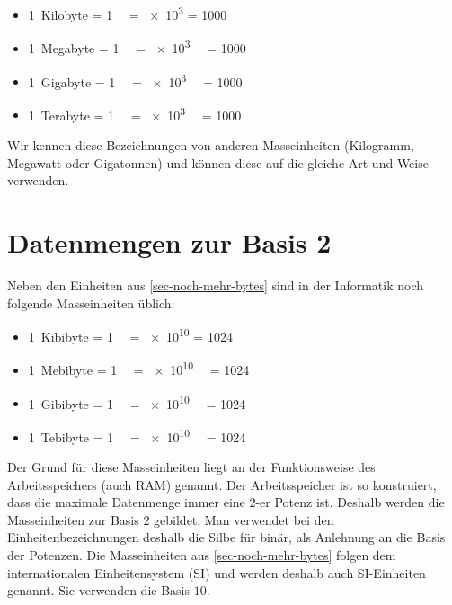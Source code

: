 \begin{itemize}
\item \qty{1}{Kilobyte} = \qty{1}{\kilo\byte} = \qty{e3}{\byte} = \qty{1000}{\byte}
\item \qty{1}{Megabyte} = \qty{1}{\mega\byte} = \qty{e3}{\kilo\byte} = \qty{1000}{\kilo\byte}
\item \qty{1}{Gigabyte} = \qty{1}{\giga\byte} = \qty{e3}{\mega\byte} = \qty{1000}{\mega\byte}
\item \qty{1}{Terabyte} = \qty{1}{\tera\byte} = \qty{e3}{\giga\byte} = \qty{1000}{\giga\byte}
\end{itemize}

Wir kennen diese Bezeichnungen von anderen Masseinheiten (Kilogramm, Megawatt oder Gigatonnen) und können diese auf die gleiche Art und Weise verwenden.

\section{Datenmengen zur Basis 2}

Neben den Einheiten aus \autoref{sec-noch-mehr-bytes} sind in der Informatik noch folgende Masseinheiten üblich:

\begin{itemize}
\item \qty{1}{Kibibyte} = \qty{1}{\kibi\byte} = \qty{e10}{\byte} = \qty{1024}{\byte}
\item \qty{1}{Mebibyte} = \qty{1}{\mebi\byte} = \qty{e10}{\kibi\byte} = \qty{1024}{\kibi\byte}
\item \qty{1}{Gibibyte} = \qty{1}{\gibi\byte} = \qty{e10}{\mebi\byte} = \qty{1024}{\mebi\byte}
\item \qty{1}{Tebibyte} = \qty{1}{\tebi\byte} = \qty{e10}{\gibi\byte} = \qty{1024}{\gibi\byte}
\end{itemize}

Der Grund für diese Masseinheiten liegt an der Funktionsweise des Arbeitsspeichers (auch \ac{RAM}) genannt. Der Arbeitsspeicher ist so konstruiert, dass die maximale Datenmenge immer eine $2$-er Potenz ist. Deshalb werden die Masseinheiten zur Basis $2$ gebildet. Man verwendet bei den Einheitenbezeichnungen deshalb die Silbe  für binär, als Anlehnung an die Basis der Potenzen. Die Masseinheiten aus \autoref{sec-noch-mehr-bytes} folgen dem internationalen Einheitensystem (\ac{SI}) und werden deshalb auch \ac{SI}-Einheiten genannt. Sie verwenden die Basis $10$.

